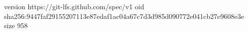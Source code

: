 version https://git-lfs.github.com/spec/v1
oid sha256:9447faf29155207113e87edaf1ac04a67c7d3d985d090772e041cb27e9608e3e
size 958
